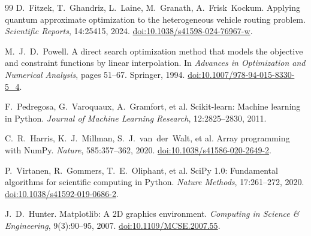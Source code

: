 \documentclass[journal]{IEEEtran}
\begin{document}
\begin{thebibliography}{99}
D.~Fitzek, T.~Ghandriz, L.~Laine, M.~Granath, A.~Frisk~Kockum.
Applying quantum approximate optimization to the heterogeneous vehicle routing
problem.
\emph{Scientific Reports}, 14:25415, 2024.
\href{https://doi.org/10.1038/s41598-024-76967-w}{doi:10.1038/s41598-024-76967-w}.

M.~J.~D.~Powell.
A direct search optimization method that models the objective and constraint
functions by linear interpolation.
In \emph{Advances in Optimization and Numerical Analysis}, pages 51--67.
Springer, 1994.
\href{https://doi.org/10.1007/978-94-015-8330-5_4}{doi:10.1007/978-94-015-8330-5\_4}.

F.~Pedregosa, G.~Varoquaux, A.~Gramfort, et al.
Scikit-learn: Machine learning in Python.
\emph{Journal of Machine Learning Research}, 12:2825--2830, 2011.

C.~R.~Harris, K.~J.~Millman, S.~J.~van~der~Walt, et al.
Array programming with NumPy.
\emph{Nature}, 585:357--362, 2020.
\href{https://doi.org/10.1038/s41586-020-2649-2}{doi:10.1038/s41586-020-2649-2}.

P.~Virtanen, R.~Gommers, T.~E.~Oliphant, et al.
SciPy 1.0: Fundamental algorithms for scientific computing in Python.
\emph{Nature Methods}, 17:261--272, 2020.
\href{https://doi.org/10.1038/s41592-019-0686-2}{doi:10.1038/s41592-019-0686-2}.

J.~D.~Hunter.
Matplotlib: A 2D graphics environment.
\emph{Computing in Science \& Engineering}, 9(3):90--95, 2007.
\href{https://doi.org/10.1109/MCSE.2007.55}{doi:10.1109/MCSE.2007.55}.

\end{thebibliography}
\end{document}

